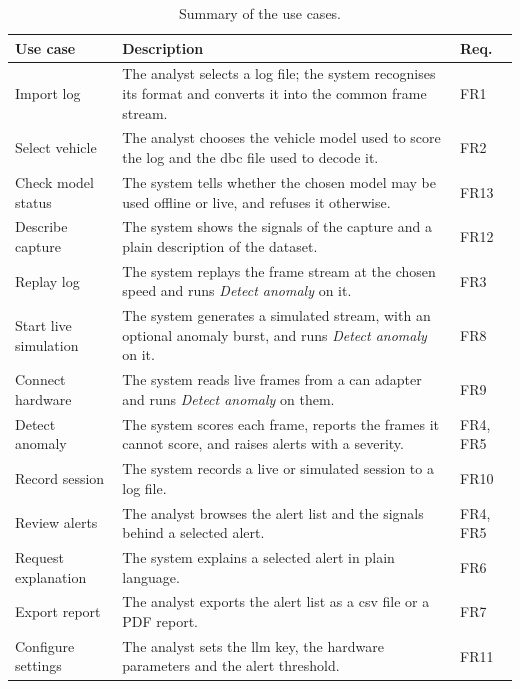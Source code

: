 \begin{table}[H]
\centering
\small
\caption{Summary of the use cases.}
\label{tab:usecase-table}
\begin{tabularx}{\textwidth}{|P{3.3cm}|Y|P{1.7cm}|}
\hline
\textbf{Use case} & \textbf{Description} & \textbf{Req.} \\
\hline
Import log & The analyst selects a log file; the system recognises its format and converts it into the common frame stream. & FR1 \\
\hline
Select vehicle & The analyst chooses the vehicle model used to score the log and the \gls{dbc} file used to decode it. & FR2 \\
\hline
Check model status & The system tells whether the chosen model may be used offline or live, and refuses it otherwise. & FR13 \\
\hline
Describe capture & The system shows the signals of the capture and a plain description of the dataset. & FR12 \\
\hline
Replay log & The system replays the frame stream at the chosen speed and runs \emph{Detect anomaly} on it. & FR3 \\
\hline
Start live simulation & The system generates a simulated stream, with an optional anomaly burst, and runs \emph{Detect anomaly} on it. & FR8 \\
\hline
Connect hardware & The system reads live frames from a \gls{can} adapter and runs \emph{Detect anomaly} on them. & FR9 \\
\hline
Detect anomaly & The system scores each frame, reports the frames it cannot score, and raises alerts with a severity. & FR4, FR5 \\
\hline
Record session & The system records a live or simulated session to a log file. & FR10 \\
\hline
Review alerts & The analyst browses the alert list and the signals behind a selected alert. & FR4, FR5 \\
\hline
Request explanation & The system explains a selected alert in plain language. & FR6 \\
\hline
Export report & The analyst exports the alert list as a \gls{csv} file or a PDF report. & FR7 \\
\hline
Configure settings & The analyst sets the \gls{llm} key, the hardware parameters and the alert threshold. & FR11 \\
\hline
\end{tabularx}
\end{table}

